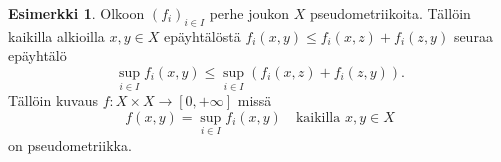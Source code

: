 \documentclass[12pt,a4paper,leqno]{report}
\theoremstyle{plain}
\theoremstyle{definition}
\newtheorem{esim}[equation]{Esimerkki}
\theoremstyle{remark}
\begin{document}
\begin{esim}%
Olkoon $(f_i)_{i\in I}$ perhe joukon $X$ pseudometriikoita. 
Tällöin kaikilla alkioilla $x,y\in X$ epäyhtälöstä 
$f_i(x,y)\leq f_i(x,z)+f_i(z,y)$ seuraa epäyhtälö 
$$\sup_{i\in I}f_i(x,y)\leq \sup_{i\in I}\left(f_i(x,z)+f_i(z,y)\right).$$
Tällöin kuvaus 
$f\colon X\times X\rightarrow [0,+\infty]$
 missä  
\begin{equation*}
f(x,y)=\sup_{i\in I}f_i(x,y)
\quad\text{kaikilla }x,y\in X 
\end{equation*} 
on pseudometriikka. 
\end{esim}
\end{document}
